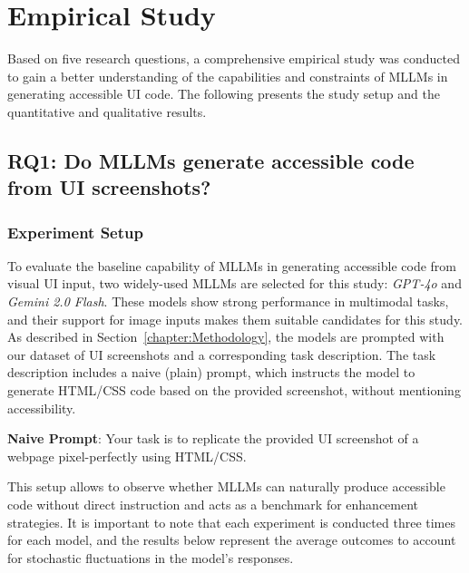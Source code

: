 \chapter{Empirical Study}\label{chapter:EmpiricalStudy}
Based on five research questions, a comprehensive empirical study 
was conducted to gain a better understanding of the 
capabilities and constraints of MLLMs in generating accessible UI code.
The following presents the study setup and the quantitative and
qualitative results.

\section{RQ1: Do MLLMs generate accessible code from UI screenshots?}
\subsection{Experiment Setup}
To evaluate the baseline capability of MLLMs in generating accessible
code from visual UI input, two widely-used MLLMs are 
selected for this study: \textit{GPT-4o} and \textit{Gemini 2.0 Flash}.
These models show strong performance in 
multimodal tasks, and their support for image inputs makes
them suitable candidates for this study.\newline
As described in Section~\ref{chapter:Methodology}, the models are 
prompted with our dataset of UI screenshots and a corresponding 
task description. The task description includes a naive (plain)
prompt, which instructs the model to generate HTML/CSS code
based on the provided screenshot, without mentioning accessibility.


\begin{roundedbox}
\textbf{Naive Prompt}: Your task is to replicate 
the provided UI screenshot of a webpage pixel-perfectly using 
HTML/CSS.
\end{roundedbox}

This setup allows to observe whether MLLMs can 
naturally produce accessible code without direct instruction 
and acts as a benchmark for enhancement strategies. 
It is important to note that each experiment is conducted three 
times for each model, and the results below represent the average 
outcomes to account for stochastic fluctuations in the model's responses.


